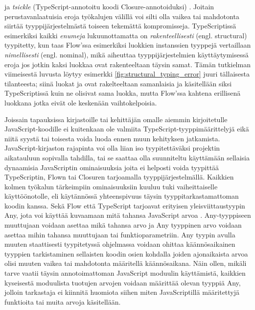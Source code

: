 ja \textit{tsickle} (TypeScript-annotoitu koodi Closure-annotoiduksi) \cite{Tsickle}.
Joitain perustavanlaatuisia eroja työkalujen välillä voi silti olla vaikea
tai mahdotonta siirtää tyyppijärjestelmästä toiseen tekemättä kompromisseja.
TypeScriptissä esimerkiksi kaikki \textit{enumeja} lukuunottamatta on
\textit{rakenteellisesti} (engl. structural) tyypitetty, kun taas Flow'ssa 
esimerkiksi luokkien instanssien tyyppejä vertaillaan \textit{nimellisesti}
(engl. nominal), mikä aiheuttaa tyyppijärjestelmien käyttäytymisessä eroja
jos jotkin kaksi luokkaa ovat rakenteeltaan täysin samat. Tämän tutkielman
viimeisestä luvusta löytyy esimerkki \ref{fig:structural_typing_error}
juuri tällaisesta tilanteesta; siinä luokat  ja
 ovat rakelteeltaan samanlaisia ja käsitellään siksi
TypeScriptissä kuin ne olisivat sama luokka, mutta Flow'ssa kahtena
erillisenä luokkana jotka eivät ole keskenään vaihtokelpoisia. 

Joissain tapauksissa kirjastoille tai kehittäjän omalle aiemmin kirjoitetulle
JavaScript-koodille ei kuitenkaan ole valmiita TypeScript-tyyppimäärittelyjä
eikä niitä syystä tai toisesta voida luoda ennen muun kehityksen jatkamista.
JavaScript-kirjaston rajapinta voi olla liian iso tyypitettäväksi projektin
aikatauluun sopivalla tahdilla, tai se saattaa olla suunniteltu käyttämään
sellaisia dynaamisia JavaScriptin ominaisuuksia joita ei helposti voida
tyypittää TypeScriptin, Flown tai Closuren tarjoamalla tyyppijärjestelmällä.
Kaikkien kolmen työkalun tärkeimpiin ominaisuuksiin kuuluu tuki vaiheittaiselle
käyttöönotolle, eli käytännössä yhteenspivuus täysin tyyppitarkastamattoman
koodin kanssa. Sekä Flow että TypeScript tarjoavat erityisen
yleisviittaustyypin Any, jota voi käyttää kuvaamaan mitä tahansa JavaScript
arvoa \cite{TypeScriptSpec}. Any-tyyppiseen muuttujaan voidaan asettaa mikä
tahansa arvo ja Any tyyppinen arvo voidaan asettaa mihin tahansa muuttujaan
tai funktioparametriin. Any tyypin avulla muuten staattisesti tyypitetyssä
ohjelmassa voidaan ohittaa käännösaikainen tyyppien tarkistaminen sellaisten
koodin osien kohdalla joiden ajonaikaista arvoa olisi muuten vaikea tai
mahdotonta määritellä käännösaikana. Näin ollen, mikäli tarve vaatii täysin
annotoimattoman JavaScript moduulin käyttämistä, kaikkien kyseisestä moduulista
tuotujen arvojen voidaan määrittää olevan tyyppiä Any, jolloin tarkastaja ei
kiinnitä huomiota siihen miten JavaScriptillä määritettyjä funktioita tai
muita arvoja käsitellään.